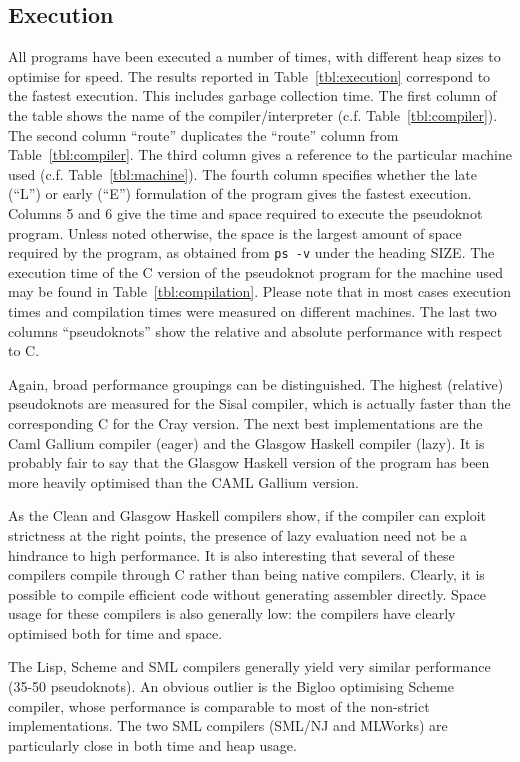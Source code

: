 \subsection{Execution}
All programs have been executed a number of times, with different heap
sizes to optimise for speed. The results reported in
Table~\ref{tbl:execution} correspond to the fastest execution. This
includes garbage collection time.
The first column of the table shows the name of the
compiler/interpreter (c.f. Table~\ref{tbl:compiler}). The second column
``route'' duplicates the ``route'' column from Table~\ref{tbl:compiler}.
The third column gives a reference to the
particular machine used (c.f. Table~\ref{tbl:machine}). The fourth
column specifies whether the late (``L'') or early (``E'') formulation of
the program gives the fastest execution. Columns 5 and 6 give the time
and space required to execute the pseudoknot program. Unless noted
otherwise, the space is the largest amount of space required by the
program, as obtained from \verb=ps -v= under the heading SIZE.
The execution time of the C version of the pseudoknot program for the
machine used may be found in Table~\ref{tbl:compilation}.
Please note that in most cases execution times and compilation times
were measured on different machines. The last two columns ``pseudoknots''
show the relative and absolute performance with respect to C.

Again, broad performance groupings can be distinguished.
The highest (relative) pseudoknots are measured for the Sisal compiler,
which is actually faster than the corresponding C for the Cray version.
The next best implementations are the Caml Gallium
compiler (eager) and the Glasgow Haskell compiler (lazy). It is
probably fair to say that the Glasgow Haskell version of the program
has been more heavily optimised than the CAML Gallium version.

As the Clean and
Glasgow Haskell compilers show, if the compiler can exploit strictness
at the right points, the presence of lazy evaluation need not be a
hindrance to high performance.  It is also interesting that several
of these compilers compile through C rather than being native compilers.
Clearly, it is possible to compile efficient code without generating
assembler directly.  Space usage for these compilers is also generally low:
the compilers have clearly optimised both for time and space.

The Lisp, Scheme and SML compilers generally yield very similar
performance (35-50 pseudoknots).  An obvious outlier is the Bigloo
optimising Scheme compiler, whose performance is comparable to most of
the non-strict implementations.  The two SML compilers (SML/NJ and
MLWorks) are particularly close in both time and heap usage.

